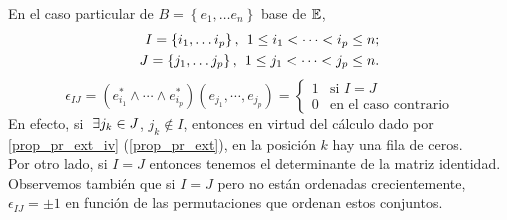 \begin{obs} \label{obs_2_pr_ext}
    En el caso particular de $B=\left\{ e_1, \dots e_n \right\}$
    base de $\mathbb{E}$,
    \[
        \begin{aligned}
            I=\left\{ i_1, \dots i_p \right\}, \hspace{0.15cm}
            1 \leq i_1 < \dots < i_p \leq n ; \\
            J=\left\{ j_1, \dots j_p \right\}, \hspace{0.15cm}
            1 \leq j_1 < \dots < j_p \leq n .
        \end{aligned}
    \]
    \[
        \epsilon _{IJ} = \left( e_{i_1}^* \wedge \cdots \wedge e_{i_p}^* \right) \left( e_{j_1}, \cdots , e_{j_p} \right)= \left\{ \begin{array}{ll}
             1 & \text{si } I=J \\
             0 & \text{en el caso contrario}
        \end{array}\right.
    \]
    En efecto, si $\hspace{0,1cm}\exists j_k \in J$, $j_k \notin I$, entonces en virtud del cálculo dado por \ref{prop_pr_ext_iv} (\ref{prop_pr_ext}), en la posición $k$ hay una fila de ceros. \\
    Por otro lado, si $I=J$ entonces tenemos el determinante de la matriz identidad. \\
    Observemos también que si $I=J$ pero no están ordenadas crecientemente, $\epsilon _{IJ}=\pm1$ en función de las permutaciones que ordenan estos conjuntos.
\end{obs}

